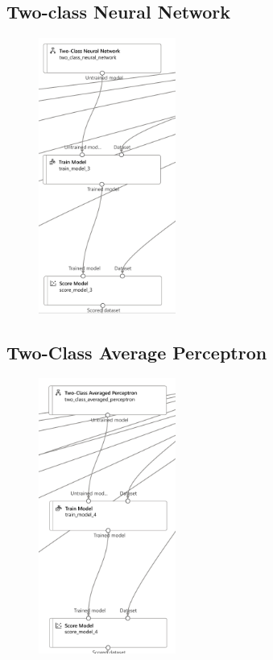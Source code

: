 \subsection{Two-class Neural Network}
\begin{figure}[H]
    \centering
    \includegraphics[width=0.4\textwidth]{images/nn_pipe}
    \label{fig:nn-pipe}
\end{figure}

\subsection{Two-Class Average Perceptron}
\begin{figure}[H]
    \centering
    \includegraphics[width=0.4\textwidth]{images/ap_pipe}
    \label{fig:ap-pipe}
\end{figure}

